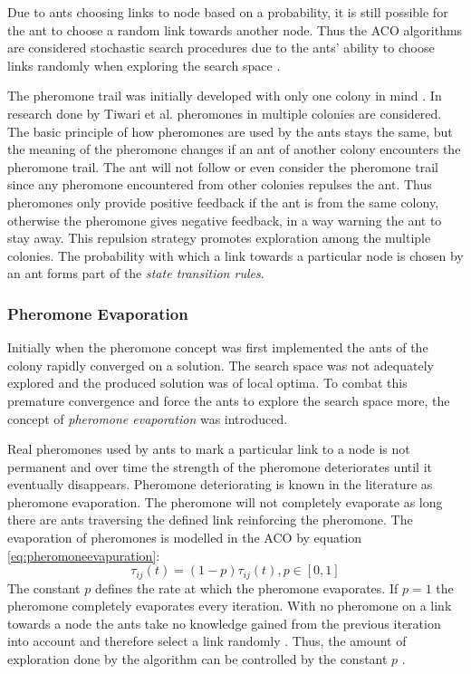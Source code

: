 Due to ants choosing links to node based on a probability, it is still possible for the ant to choose a random link towards another node. Thus the \gls{ACO} algorithms are considered stochastic search procedures due to the ants' ability to choose links randomly when exploring the search space \cite{ACOSurvey,ImpACOComplex}.

The pheromone trail was initially developed with only one colony in mind \cite{CompuIntelligenceIntro}. In research done by Tiwari et al.\cite{ACOLargeProblem} pheromones in multiple colonies are considered. The basic principle of how pheromones are used by the ants stays the same, but the meaning of the pheromone changes if an ant of another colony encounters the pheromone trail\cite{AntQAP,AntsAndStigmergy,CompuIntelligenceIntro}. The ant will not follow or even consider the pheromone trail since any pheromone encountered from other colonies repulses the ant\cite{ACOLargeProblem}. Thus pheromones only provide positive feedback if the ant is from the same colony, otherwise the pheromone gives negative feedback, in a way warning the ant to stay away\cite{ACOLargeProblem}. This repulsion strategy promotes exploration among the multiple colonies\cite{ACOLargeProblem}. The probability with which a link towards a particular node is chosen by an ant forms part of the \emph{state transition rules}.

\subsubsection{Pheromone Evaporation}
\label{sec:pheromoneevapuation}
Initially when the pheromone concept was first implemented the ants of the colony rapidly converged on a solution\cite{CompuIntelligenceIntro}. The search space was not adequately explored and the produced solution was of local optima\cite{AntsAndStigmergy}. To combat this premature convergence and force the ants to explore the search space more, the concept of \emph{pheromone evaporation} was introduced\cite{AntIntroTrends,AntSurvey}. 

Real pheromones used by ants to mark a particular link to a node is not permanent and over time the strength of the pheromone deteriorates until it eventually disappears\cite{CompuIntelligenceIntro}. Pheromone deteriorating is known in the literature as pheromone evaporation\cite{CompuIntelligenceIntro}. The pheromone will not completely evaporate as long there are ants traversing the defined link reinforcing the pheromone. The evaporation of pheromones is modelled in the \gls{ACO} by equation \ref{eq:pheromoneevapuration}\cite{AntIntroTrends,AntSurvey}:
\begin{equation}
\label{eq:pheromoneevapuration}
	\tau_{ij}(t) = (1-p)\tau_{ij}(t), p\in [0,1]
\end{equation}
The constant $p$ defines the rate at which the pheromone evaporates. If $p=1$ the pheromone completely evaporates every iteration. With no pheromone on a link towards a node the ants take no knowledge gained from the previous iteration into account and therefore select a link randomly \cite{CompuIntelligenceIntro,AntsAndStigmergy}. Thus, the amount of exploration done by the algorithm can be controlled by the constant $p$ \cite{CompuIntelligenceIntro,AntsAndStigmergy}.

